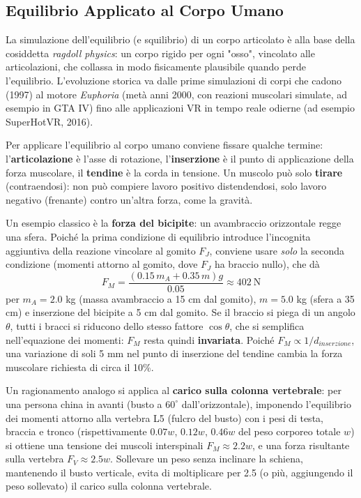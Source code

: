 \documentclass[a4paper,11pt]{article}
\begin{document}
\subsection{Equilibrio Applicato al Corpo Umano}

La simulazione dell'equilibrio (e squilibrio) di un corpo articolato è alla base della cosiddetta \emph{ragdoll physics}: un corpo rigido per ogni "osso", vincolato alle articolazioni, che collassa in modo fisicamente plausibile quando perde l'equilibrio. L'evoluzione storica va dalle prime simulazioni di corpi che cadono (1997) al motore \emph{Euphoria} (metà anni 2000, con reazioni muscolari simulate, ad esempio in GTA IV) fino alle applicazioni VR in tempo reale odierne (ad esempio SuperHotVR, 2016).

Per applicare l'equilibrio al corpo umano conviene fissare qualche termine: l'\textbf{articolazione} è l'asse di rotazione, l'\textbf{inserzione} è il punto di applicazione della forza muscolare, il \textbf{tendine} è la corda in tensione. Un muscolo può solo \textbf{tirare} (contraendosi): non può compiere lavoro positivo distendendosi, solo lavoro negativo (frenante) contro un'altra forza, come la gravità.

Un esempio classico è la \textbf{forza del bicipite}: un avambraccio orizzontale regge una sfera. Poiché la prima condizione di equilibrio introduce l'incognita aggiuntiva della reazione vincolare al gomito $F_J$, conviene usare \emph{solo} la seconda condizione (momenti attorno al gomito, dove $F_J$ ha braccio nullo), che dà
\[
F_M = \frac{(0.15\,m_A+0.35\,m)g}{0.05} \approx 402\ \text{N}
\]
per $m_A=2.0$ kg (massa avambraccio a 15 cm dal gomito), $m=5.0$ kg (sfera a 35 cm) e inserzione del bicipite a 5 cm dal gomito. Se il braccio si piega di un angolo $\theta$, tutti i bracci si riducono dello stesso fattore $\cos\theta$, che si semplifica nell'equazione dei momenti: $F_M$ resta quindi \textbf{invariata}. Poiché $F_M\propto1/d_{inserzione}$, una variazione di soli 5 mm nel punto di inserzione del tendine cambia la forza muscolare richiesta di circa il 10\%.

Un ragionamento analogo si applica al \textbf{carico sulla colonna vertebrale}: per una persona china in avanti (busto a $60^{\circ}$ dall'orizzontale), imponendo l'equilibrio dei momenti attorno alla vertebra L5 (fulcro del busto) con i pesi di testa, braccia e tronco (rispettivamente $0.07w$, $0.12w$, $0.46w$ del peso corporeo totale $w$) si ottiene una tensione dei muscoli interspinali $F_M\approx2.2w$, e una forza risultante sulla vertebra $F_V\approx2.5w$. Sollevare un peso senza inclinare la schiena, mantenendo il busto verticale, evita di moltiplicare per 2.5 (o più, aggiungendo il peso sollevato) il carico sulla colonna vertebrale.
\end{document}
